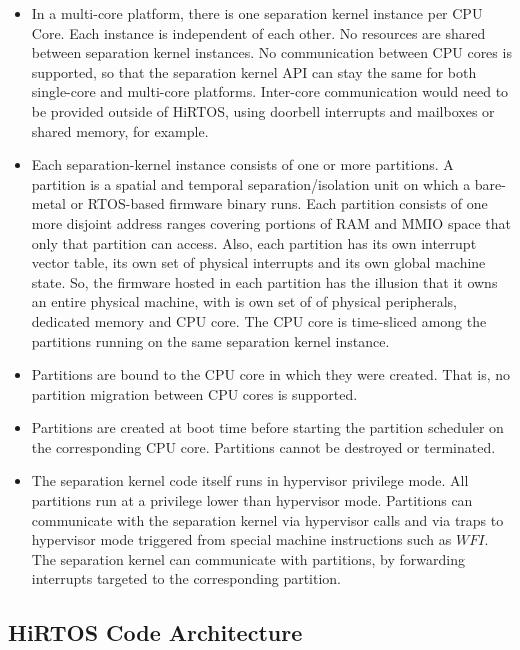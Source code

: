 \documentclass{AUJarticle}
\begin{document}
\begin{itemize}

\item In a multi-core platform, there is one separation kernel instance per CPU Core. Each instance is
independent of each other. No resources are shared between separation kernel instances. No communication between
CPU cores is supported, so that the separation kernel API can stay the same for both single-core
and multi-core platforms. Inter-core communication would need to be provided outside of HiRTOS,
using doorbell interrupts and mailboxes or shared memory, for example.

\item Each separation-kernel instance consists of one or more partitions. A partition is a spatial and temporal
separation/isolation unit on which a bare-metal or RTOS-based firmware binary runs. Each partition
consists of one more disjoint address ranges covering portions of RAM and MMIO space that only that
partition can access. Also, each partition has its own interrupt vector table, its own set of physical
interrupts and its own global machine state. So, the firmware hosted in each partition has the illusion
that it owns an entire physical machine, with is own set of of physical peripherals, dedicated memory
and CPU core. The CPU core is time-sliced among the partitions running on the same separation kernel instance.

\item
Partitions are bound to the CPU core in which they were created. That is, no partition migration between
CPU cores is supported.

\item
Partitions are created at boot time before starting the partition scheduler on the corresponding CPU core.
Partitions cannot be destroyed or terminated.

\item
The separation kernel code itself runs in hypervisor privilege mode. All partitions run at a privilege lower
than hypervisor mode. Partitions can communicate with the separation kernel via hypervisor calls and via
traps to hypervisor mode triggered from special machine instructions such as $WFI$. The separation kernel
can communicate with partitions, by forwarding interrupts targeted to the corresponding partition.

\end{itemize}


\subsection{HiRTOS Code Architecture}
\end{document}
